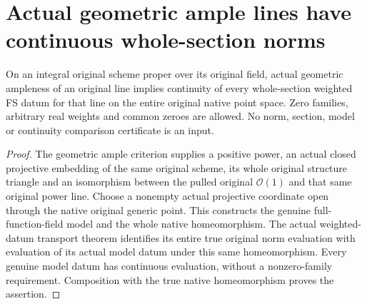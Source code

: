 \section{Actual geometric ample lines have continuous whole-section norms}
\label{sec:native-ample-line-norm-continuity}

\begin{theorem}
\label{thm:native-ample-line-whole-fs-continuous}
\leanok
{}
On an integral original scheme proper over its original field, actual
geometric ampleness of an original line implies continuity of every
whole-section weighted FS datum for that line on the entire original
native point space. Zero families, arbitrary real weights and common
zeroes are allowed. No norm, section, model or continuity comparison
certificate is an input.
\end{theorem}
\begin{proof}
The geometric ample criterion supplies a positive power, an actual closed
projective embedding of the same original scheme, its whole original
structure triangle and an isomorphism between the pulled original
$\mathcal O(1)$ and that same original power line. Choose a nonempty actual
projective coordinate open through the native original generic point.
This constructs the genuine full-function-field model and the whole
native homeomorphism. The actual weighted-datum transport theorem identifies
its entire true original norm evaluation with evaluation of its actual
model datum under this same homeomorphism. Every genuine model datum has
continuous evaluation, without a nonzero-family requirement. Composition
with the true native homeomorphism proves the assertion.
\end{proof}

